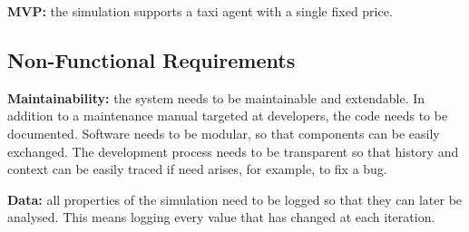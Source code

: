 \textbf{MVP:} the simulation supports a taxi agent with a single fixed price.


\subsection{Non-Functional Requirements}

\textbf{Maintainability:} the system needs to be maintainable and extendable.
In addition to a maintenance manual targeted at developers, the code needs to
be documented. Software needs to be modular, so that components can be easily
exchanged. The development process needs to be transparent so that history and
context can be easily traced if need arises, for example, to fix a bug.

\textbf{Data:} all properties of the simulation need to be logged so that they
can later be analysed. This means logging every value that has changed at each
iteration.
